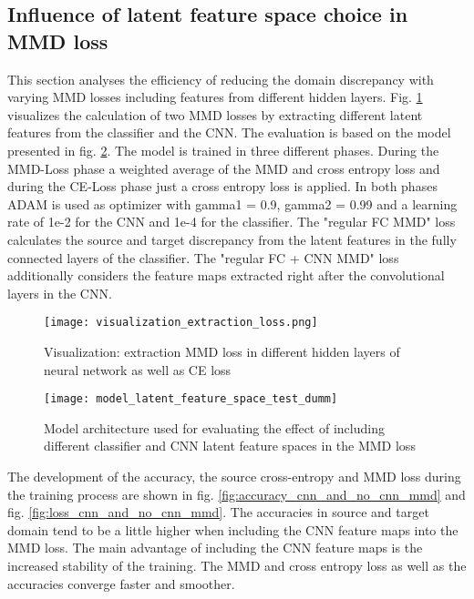 \subsection{Influence of latent feature space choice in MMD loss}
This section analyses the efficiency of reducing the domain discrepancy with varying MMD losses including features from different hidden layers. Fig. \ref{fig:visualization_extraction_loss} visualizes the calculation of two MMD losses by extracting different latent features from the classifier and the CNN. The evaluation is based on the model presented in fig. \ref{fig:model_latent_feature_space_test_dumm}. The model is trained in three different phases. During the MMD-Loss phase a weighted average of the MMD and cross entropy loss and during the CE-Loss phase just a cross entropy loss is applied. In both phases ADAM is used as optimizer with gamma1 = 0.9, gamma2 = 0.99 and a learning rate of 1e-2 for the CNN and 1e-4 for the classifier. The "regular FC MMD" loss calculates the source and target discrepancy from the latent features in the fully connected layers of the classifier. The "regular FC + CNN MMD" loss additionally considers the feature maps extracted right after the convolutional layers in the CNN. 

\begin{figure}[htpb]
  \centering
  \texttt{[image: visualization\_extraction\_loss.png]}
  \caption {Visualization: extraction MMD loss in different hidden layers of neural network as well as CE loss} \label{fig:visualization_extraction_loss}
\end{figure}



\begin{figure}[htpb]
  \centering
  \texttt{[image: model\_latent\_feature\_space\_test\_dumm]}
  \caption {Model architecture used for evaluating the effect of including different classifier and CNN latent feature spaces in the MMD loss} \label{fig:model_latent_feature_space_test_dumm}
\end{figure}

The development of the accuracy, the source cross-entropy and MMD loss during the training process are shown in fig. \ref{fig:accuracy_cnn_and_no_cnn_mmd} and fig. \ref{fig:loss_cnn_and_no_cnn_mmd}. The accuracies in source and target domain tend to be a little higher when including the CNN feature maps into the MMD loss. The main advantage of including the CNN feature maps is the increased stability of the training. The MMD and cross entropy loss as well as the accuracies converge faster and smoother.






